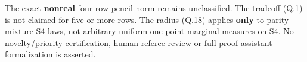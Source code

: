 \documentclass[
  11pt,
]{article}
\begin{document}
The exact \textbf{nonreal} four-row pencil norm remains unclassified.
The tradeoff (Q.1) is not claimed for five or more rows. The radius
(Q.18) applies \textbf{only} to parity-mixture S4 laws, not arbitrary
uniform-one-point-marginal measures on S4. No novelty/priority
certification, human referee review or full proof-assistant
formalization is asserted.
\end{document}
